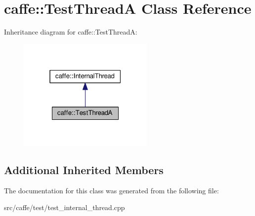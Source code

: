 \hypertarget{classcaffe_1_1_test_thread_a}{}\section{caffe\+:\+:Test\+ThreadA Class Reference}
\label{classcaffe_1_1_test_thread_a}


Inheritance diagram for caffe\+:\+:Test\+ThreadA\+:
\nopagebreak
\begin{figure}[H]
\begin{center}
\leavevmode
\includegraphics[width=187pt]{classcaffe_1_1_test_thread_a__inherit__graph}
\end{center}
\end{figure}
\subsection*{Additional Inherited Members}


The documentation for this class was generated from the following file\+:\begin{DoxyCompactItemize}
\item 
src/caffe/test/test\+\_\+internal\+\_\+thread.\+cpp\end{DoxyCompactItemize}
